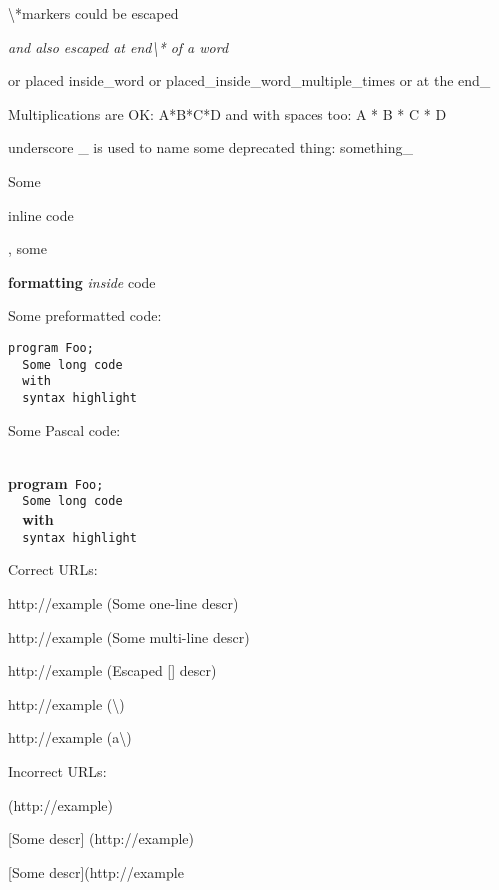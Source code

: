 \documentclass{report}
\begin{document}
{\textbackslash}*markers could be escaped

\textit{and also escaped at end{\textbackslash}* of a word}

or placed inside{\_}word or placed{\_}inside{\_}word{\_}multiple{\_}times or at the end{\_}

Multiplications are OK: A*B*C*D and with spaces too: A * B * C * D

underscore {\_} is used to name some deprecated thing: something{\_}

Some \begin{ttfamily}inline code\end{ttfamily}, some \begin{ttfamily}\textbf{formatting} \textit{inside} code\end{ttfamily}

Some preformatted code:

\begin{verbatim}
program Foo;
  Some long code
  with
  syntax highlight\end{verbatim}

Some Pascal code:

\texttt{\\\nopagebreak[3]
}\textbf{program}\texttt{~Foo;\\\nopagebreak[3]
~~Some~long~code\\\nopagebreak[3]
~~}\textbf{with}\texttt{\\\nopagebreak[3]
~~syntax~highlight\\
}

Correct URLs:

http://example (Some one-line descr)

http://example (Some multi-line
   descr)

http://example (Escaped [] descr)

http://example ({\textbackslash})

http://example (a{\textbackslash})

Incorrect URLs:

(http://example)

[Some descr] (http://example)

[Some descr](http://example
\end{document}
